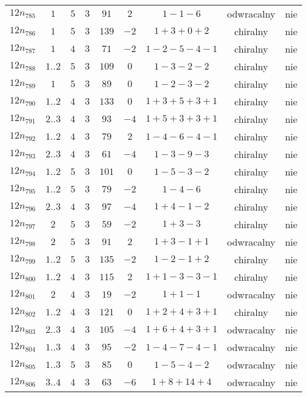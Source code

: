 \begin{longtable}{ccccccccc}
$12n_{785}$ & $1$ & $5$ & $3$ & $91$ & $2$ & $1-1-6$ & odwracalny & nie \\
$12n_{786}$ & $1$ & $5$ & $3$ & $139$ & $-2$ & $1+3+0+2$ & chiralny & nie \\
$12n_{787}$ & $1$ & $4$ & $3$ & $71$ & $-2$ & $1-2-5-4-1$ & chiralny & nie \\
$12n_{788}$ & $1..2$ & $5$ & $3$ & $109$ & $0$ & $1-3-2-2$ & chiralny & nie \\
$12n_{789}$ & $1$ & $5$ & $3$ & $89$ & $0$ & $1-2-3-2$ & chiralny & nie \\
$12n_{790}$ & $1..2$ & $4$ & $3$ & $133$ & $0$ & $1+3+5+3+1$ & chiralny & nie \\
$12n_{791}$ & $2..3$ & $4$ & $3$ & $93$ & $-4$ & $1+5+3+3+1$ & chiralny & nie \\
$12n_{792}$ & $1..2$ & $4$ & $3$ & $79$ & $2$ & $1-4-6-4-1$ & chiralny & nie \\
$12n_{793}$ & $2..3$ & $4$ & $3$ & $61$ & $-4$ & $1-3-9-3$ & chiralny & nie \\
$12n_{794}$ & $1..2$ & $5$ & $3$ & $101$ & $0$ & $1-5-3-2$ & chiralny & nie \\
$12n_{795}$ & $1..2$ & $5$ & $3$ & $79$ & $-2$ & $1-4-6$ & chiralny & nie \\
$12n_{796}$ & $2..3$ & $4$ & $3$ & $97$ & $-4$ & $1+4-1-2$ & chiralny & nie \\
$12n_{797}$ & $2$ & $5$ & $3$ & $59$ & $-2$ & $1+3-3$ & chiralny & nie \\
$12n_{798}$ & $2$ & $5$ & $3$ & $91$ & $2$ & $1+3-1+1$ & odwracalny & nie \\
$12n_{799}$ & $1..2$ & $5$ & $3$ & $135$ & $-2$ & $1-2-1+2$ & chiralny & nie \\
$12n_{800}$ & $1..2$ & $4$ & $3$ & $115$ & $2$ & $1+1-3-3-1$ & chiralny & nie \\
$12n_{801}$ & $2$ & $4$ & $3$ & $19$ & $-2$ & $1+1-1$ & odwracalny & nie \\
$12n_{802}$ & $1..2$ & $4$ & $3$ & $121$ & $0$ & $1+2+4+3+1$ & chiralny & nie \\
$12n_{803}$ & $2..3$ & $4$ & $3$ & $105$ & $-4$ & $1+6+4+3+1$ & odwracalny & nie \\
$12n_{804}$ & $1..3$ & $4$ & $3$ & $95$ & $-2$ & $1-4-7-4-1$ & odwracalny & nie \\
$12n_{805}$ & $1..3$ & $5$ & $3$ & $85$ & $0$ & $1-5-4-2$ & odwracalny & nie \\
$12n_{806}$ & $3..4$ & $4$ & $3$ & $63$ & $-6$ & $1+8+14+4$ & odwracalny & nie \\

\end{longtable}
